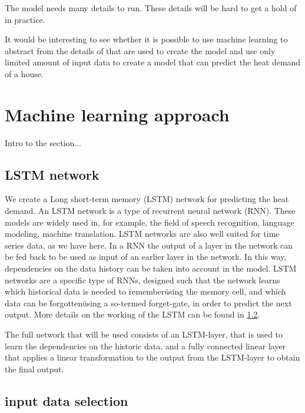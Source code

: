 The model needs many details to run. These details will be hard to get a hold of in practice.

It would be interesting to see whether it is possible to use machine learning to abstract from the details of that are used to create the model and use only limited amount of input data to create a model that can predict the heat demand of a house. 

 




\section{Machine learning approach}\label{s:MLA}
Intro to the section...

\subsection{LSTM network}
We create a Long short-term memory (LSTM) network for predicting the heat demand. An LSTM network is a type of recurrent neural network (RNN). These models are widely used in, for example, the field of speech recognition, language modeling, machine translation. LSTM networks are also well suited for time series data, as we have here. In a RNN the output of a layer in the network can be fed back to be used as input of an earlier layer in the network. In this way, dependencies on the data history can be taken into account in the model. LSTM networks are a specific type of RNNs, designed such that the network learns which historical data is needed to \"remember\" using the memory cell, and which data can be \"forgotten\" using a so-termed forget-gate, in order to predict the next output. More details on the working of the LSTM can be found in \ref{}. 

The full network that will be used consists of an LSTM-layer, that is used to learn the dependencies on the historic data, and a fully connected linear layer that applies a linear transformation to the output from the LSTM-layer to obtain the final output.  



\subsection{input data selection}

